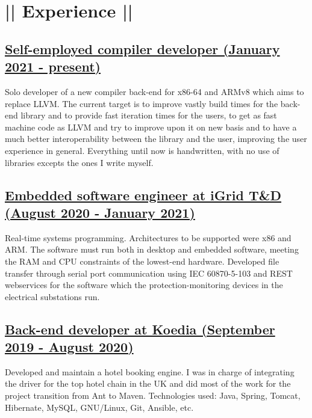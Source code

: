 \section*{|| Experience ||}
\subsection*{\underline{Self-employed compiler developer (January 2021 - present)}}
Solo developer of a new compiler back-end for x86-64 and ARMv8 which aims to replace LLVM. The current target is to improve vastly build times for the back-end library and to provide fast iteration times for the users, to get as fast machine code as LLVM and try to improve upon it on new basis and to have a much better interoperability between the library and the user, improving the user experience in general. Everything until now is handwritten, with no use of libraries excepts the ones I write myself.


\subsection*{\underline{Embedded software engineer at iGrid T\&D (August 2020 - January 2021)}}
Real-time systems programming. Architectures to be supported were x86 and ARM. The software must run both in desktop and embedded software, meeting the RAM and CPU constraints of the lowest-end hardware. Developed file transfer through serial port communication using IEC 60870-5-103 and REST webservices for the software which the protection-monitoring devices in the electrical substations run.

\subsection*{\underline{Back-end developer at Koedia (September 2019 - August 2020)}}
Developed and maintain a hotel booking engine. I was in charge of integrating the driver	for the top hotel chain in the UK and did most of the work for the project transition from 	Ant to Maven. Technologies used: Java, Spring, Tomcat, Hibernate, MySQL, GNU/Linux, Git, Ansible, etc.